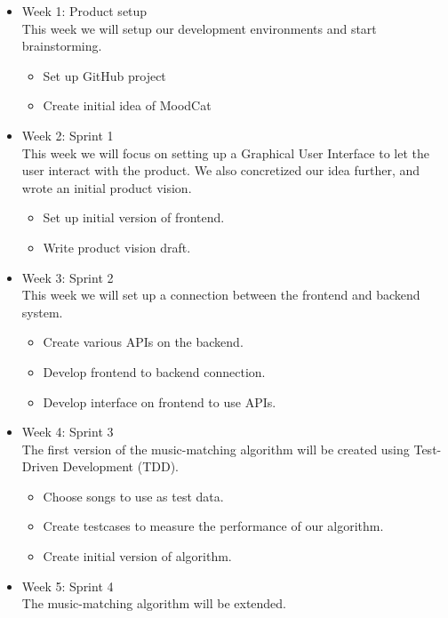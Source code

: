 \begin{itemize}
\item Week 1: Product setup\\
This week we will setup our development environments and start brainstorming.

\begin{itemize}
\item Set up GitHub project \cite{githubRepo}
\item Create initial idea of MoodCat
\end{itemize}

\item Week 2: Sprint 1\\
This week we will focus on setting up a Graphical User Interface to let the user interact with the product.
We also concretized our idea further, and wrote an initial product vision.

\begin{itemize}
\item Set up initial version of frontend.
\item Write product vision draft.
\end{itemize}

\item Week 3: Sprint 2\\
This week we will set up a connection between the frontend and backend system.

\begin{itemize}
\item Create various APIs on the backend.
\item Develop frontend to backend connection.
\item Develop interface on frontend to use \gls{APIs}.
\end{itemize}

\item Week 4: Sprint 3\\
The first version of the music-matching algorithm will be created using Test-Driven Development (TDD)\cite{TDD}.

\begin{itemize}
\item Choose songs to use as test data.
\item Create testcases to measure the performance of our algorithm.
\item Create initial version of algorithm.
\end{itemize}

\item Week 5: Sprint 4\\
The music-matching algorithm will be extended.


\end{itemize}
